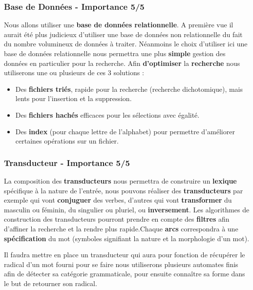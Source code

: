 \subsubsection{Base de Données - Importance 5/5}


{Nous allons utiliser une \textbf{base de données relationnelle}. A première vue il aurait été plus judicieux d'utiliser une base de données non relationnelle du fait du nombre volumineux de données à traiter. Néanmoins le choix d'utiliser ici une base de données relationnelle nous permettra une plus \textbf{simple} gestion des données en particulier pour la recherche. Afin \textbf{d'optimiser} la \textbf{recherche} nous utiliserons une ou plusieurs de ces 3 solutions : 
\begin{itemize}
\item Des \textbf{fichiers triés}, rapide pour la recherche (recherche dichotomique), mais lents pour l'insertion et la suppression.
\item Des \textbf{fichiers hachés} efficaces pour les sélections avec égalité.
\item Des \textbf{index} (pour chaque lettre de l'alphabet) pour permettre d'améliorer certaines opérations sur un fichier.
\end{itemize}\par}

\subsubsection{Transducteur - Importance 5/5}


La composition des \textbf{transducteurs} nous permettra de construire un \textbf{lexique} spécifique à la nature de l'entrée, nous pouvons réaliser des \textbf{transducteurs} par exemple qui vont \textbf{conjuguer} des verbes, d'autres qui vont \textbf{transformer} du masculin ou féminin, du singulier ou pluriel, ou \textbf{inversement}. Les algorithmes de construction des transducteurs pourront prendre en compte des \textbf{filtres} afin d'affiner la recherche et la rendre plus rapide.Chaque \textbf{arcs} correspondra à une \textbf{spécification} du mot (symboles signifiant la nature et la morphologie d'un mot).



{Il faudra mettre en place un transducteur qui aura pour fonction de récupérer le radical d'un mot fourni pour se faire nous utiliserons plusieurs automates finis afin de détecter sa catégorie grammaticale, pour ensuite connaître sa forme dans le but de retourner son radical.}


